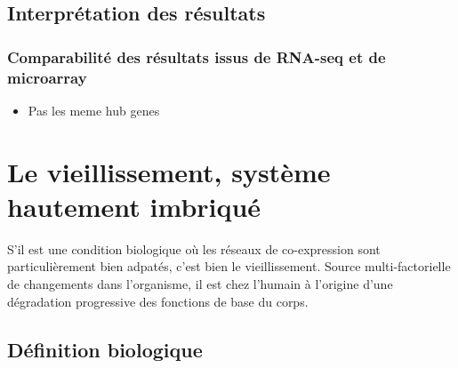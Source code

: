 \subsection{Interprétation des résultats}

\subsubsection{Comparabilité des résultats issus de RNA-seq et de microarray}
\begin{itemize}
    \item Pas les meme hub genes %
\end{itemize}




\section{Le vieillissement, système hautement imbriqué}
S'il est une condition biologique où les réseaux de co-expression sont particulièrement bien adpatés, c'est bien le vieillissement. Source multi-factorielle de changements dans l'organisme, il est chez l'humain à l'origine d'une dégradation progressive des fonctions de base du corps.



\subsection{Définition biologique}


